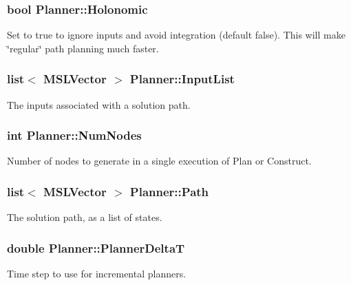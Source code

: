 \subsubsection{\setlength{\rightskip}{0pt plus 5cm}bool Planner::Holonomic}\label{class_Planner_m5}


Set to true to ignore inputs and avoid integration (default false). This will make \char`\"{}regular\char`\"{} path planning much faster.

\subsubsection{\setlength{\rightskip}{0pt plus 5cm}list$<$ {\bf MSLVector} $>$ Planner::Input\-List}\label{class_Planner_m12}


The inputs associated with a solution path.

\subsubsection{\setlength{\rightskip}{0pt plus 5cm}int Planner::Num\-Nodes}\label{class_Planner_m13}


Number of nodes to generate in a single execution of Plan or Construct.

\subsubsection{\setlength{\rightskip}{0pt plus 5cm}list$<$ {\bf MSLVector} $>$ Planner::Path}\label{class_Planner_m2}


The solution path, as a list of states.

\subsubsection{\setlength{\rightskip}{0pt plus 5cm}double Planner::Planner\-Delta\-T}\label{class_Planner_m14}


Time step to use for incremental planners.

